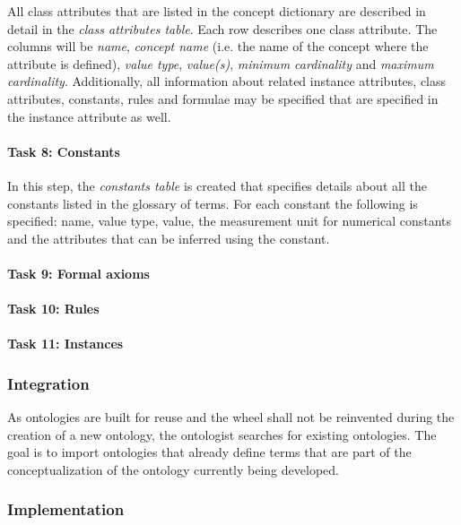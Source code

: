 All class attributes that are listed in the concept dictionary are described in detail in the \emph{class attributes table}. Each row describes one class attribute. The columns will be \emph{name}, \emph{concept name} (i.e. the name of the concept where the attribute is defined), \emph{value type}, \emph{value(s)}, \emph{minimum cardinality} and \emph{maximum cardinality}. Additionally, all information about related instance attributes, class attributes, constants, rules and formulae may be specified that are specified in the instance attribute as well.

\paragraph{Task 8: Constants}

In this step, the \emph{constants table} is created that specifies details about all the constants listed in the glossary of terms. For each constant the following is specified: name, value type, value, the measurement unit for numerical constants and the attributes that can be inferred using the constant.

\paragraph{Task 9: Formal axioms}


\paragraph{Task 10: Rules}


\paragraph{Task 11: Instances}


\subsubsection{Integration}

As ontologies are built for reuse and the wheel shall not be reinvented during the creation of a new ontology, the ontologist searches for existing ontologies. The goal is to import ontologies that already define terms that are part of the conceptualization of the ontology currently being developed.

\subsubsection{Implementation}

